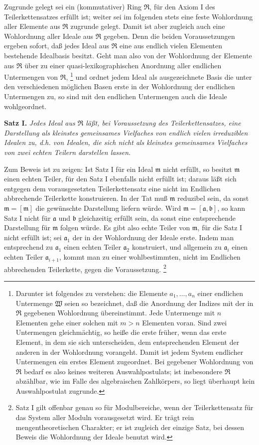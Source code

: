 \documentclass[11pt]{article}
\providecommand{\mR}{\mathfrak{R}}
\providecommand{\ma}{\mathfrak{a}}
\providecommand{\mb}{\mathfrak{b}}
\providecommand{\mm}{\mathfrak{m}}
\begin{document}
Zugrunde gelegt sei ein (kommutativer) Ring $\mR$, für den Axiom I des Teilerkettensatzes erfüllt ist; weiter sei im folgenden stets eine feste Wohlordnung aller Elemente aus $\mR$ zugrunde gelegt. Damit ist aber zugleich auch eine Wohlordnung aller Ideale aus $\mR$ gegeben. Denn die beiden Voraussetzungen ergeben sofort, daß jedes Ideal aus $\mR$ eine aus endlich vielen Elementen bestehende Idealbasis besitzt. Geht man also von der Wohlordnung der Elemente aus $\mR$ über zu einer quasi-lexikographischen Anordnung aller endlichen Untermengen von $\mR$,
\footnote{Darunter ist folgendes zu verstehen: die Elemente $a_1,\ldots,a_n$ einer endlichen Untermenge $\mathfrak W$ seien so bezeichnet, daß die Anordnung der Indizes mit der in $\mR$ gegebenen Wohlordnung übereinstimmt. Jede Untermenge mit $n$ Elementen gehe einer solchen mit $m>n$ Elementen voran. Sind zwei Untermengen gleichmächtig, so heiße die erste früher, wenn das erste Element, in dem sie sich unterscheiden, dem entsprechenden Element der anderen in der Wohlordnung vorangeht. Damit ist jedem System endlicher Untermengen ein erstes Element zugeordnet. Bei gegebener Wohlordnung von $\mR$ bedarf es also keines weiteren Auswahlpostulats; ist insbesondere $\mR$ abzählbar, wie im Falle des algebraischen Zahlkörpers, so liegt überhaupt kein Auswahlpostulat zugrunde.}
und ordnet jedem Ideal als ausgezeichnete Basis die unter den verschiedenen möglichen Basen erste in der Wohlordnung der endlichen Untermengen zu, so sind mit den endlichen Untermengen auch die Ideale wohlgeordnet.

\textbf{Satz I.} \emph{Jedes Ideal aus $\mR$ läßt, bei Voraussetzung des Teilerkettensatzes, eine Darstellung als kleinstes gemeinsames Vielfaches von endlich vielen irreduziblen Idealen zu, d.h. von Idealen, die sich nicht als kleinstes gemeinsames Vielfaches von zwei echten Teilern darstellen lassen.}

Zum Beweis ist zu zeigen: Ist Satz I für ein Ideal $\mm$ nicht erfüllt, so besitzt $\mm$ einen echten Teiler, für den Satz I ebenfalls nicht erfüllt ist; daraus läßt sich entgegen dem vorausgesetzten Teilerkettensatz eine nicht im Endlichen abbrechende Teilerkette konstruieren. In der Tat muß $\mm$ reduzibel sein, da sonst $\mm=[\mm]$ die gewünschte Darstellung liefern würde. Wird $\mm=[\ma,\mb]$, so kann Satz I nicht für $\ma$ und $\mb$ gleichzeitig erfüllt sein, da sonst eine entsprechende Darstellung für $\mm$ folgen würde. Es gibt also echte Teiler von $\mm$, für die Satz I nicht erfüllt ist; sei $\ma_1$ der in der Wohlordnung der Ideale erste. Indem man entsprechend zu $\ma_1$ einen echten Teiler $\ma_2$ konstruiert, und allgemein zu $\ma_i$ einen echten Teiler $\ma_{i+1}$, kommt man zu einer wohlbestimmten, nicht im Endlichen abbrechenden Teilerkette, gegen die Voraussetzung.
\footnote{Satz I gilt offenbar genau so für Modulbereiche, wenn der Teilerkettensatz für das System aller Moduln vorausgesetzt wird. Er trägt rein mengentheoretischen Charakter; er ist zugleich der einzige Satz, bei dessen Beweis die Wohlordnung der Ideale benutzt wird.}
\end{document}
